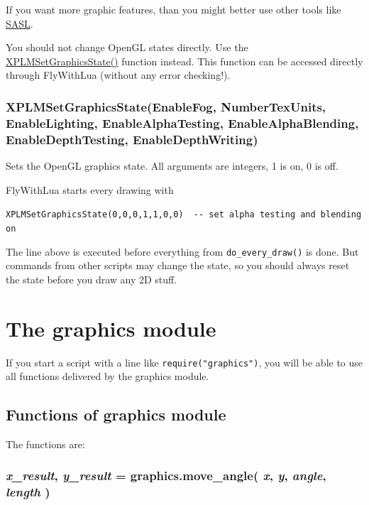 \documentclass[11pt,parskip=half,a4paper]{scrartcl}
\begin{document}
If you want more graphic features, than you might better use other tools like \href{http://code.google.com/p/sasl/}{SASL}.

You should not change OpenGL states directly. Use the \href{http://www.xsquawkbox.net/xpsdk/mediawiki/XPLMSetGraphicsState}{XPLMSetGraphicsState()} function instead. This function can be accessed directly through FlyWithLua (without any error checking!).

\subsubsection{XPLMSetGraphicsState(EnableFog, NumberTexUnits, EnableLighting, EnableAlphaTesting, EnableAlphaBlending, EnableDepthTesting, EnableDepthWriting)}

Sets the OpenGL graphics state. All arguments are integers, 1 is on, 0 is off.

FlyWithLua starts every drawing with

\verb|XPLMSetGraphicsState(0,0,0,1,1,0,0)  -- set alpha testing and blending on|

The line above is executed before everything from \verb|do_every_draw()| is done. But commands from other scripts may change the state, so you should always reset the state before you draw any 2D stuff.

\newpage
\section{The graphics module}

If you start a script with a line like \verb|require("graphics")|, you will be able to use all functions delivered by the graphics module. 

\subsection{Functions of graphics module}

The functions are:

\subsubsection{\emph{x\_result}, \emph{y\_result} = graphics.move\_angle( \emph{x}, \emph{y}, \emph{angle}, \emph{length} )}
\end{document}
